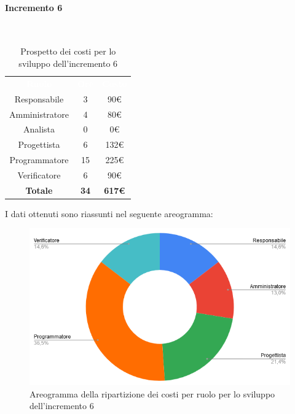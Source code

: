 \paragraph*{Incremento 6}\mbox{} \\
\begin{table}[H]
\centering\renewcommand{\arraystretch}{1.5}
\caption{Prospetto dei costi per lo sviluppo dell'incremento 6}
\vspace{0.2cm}
\begin{tabular}{ c c c }
\rowcolor{redafk}
\textcolor{white}{\textbf{Ruolo}} & \textcolor{white}{\textbf{Ore}} &
\textcolor{white}{\textbf{Costo}}  \\
Responsabile & 3 & 90€ \\
Amministratore & 4 & 80€ \\
Analista & 0 & 0€ \\
Progettista & 6 & 132€ \\
Programmatore & 15 & 225€  \\
Verificatore & 6 & 90€  \\
\rowcolor{lastrowcolor}
\textbf{Totale} & \textbf{34} & \textbf{617€}  \\
\end{tabular}
\end{table}
 
I dati ottenuti sono riassunti nel seguente areogramma:
\begin{figure}[H]
\centering
\includegraphics[scale=0.60]{img/grafici/torta_inc6.png}
\caption{Areogramma della ripartizione dei costi per ruolo per lo sviluppo dell'incremento 6}
\end{figure}

